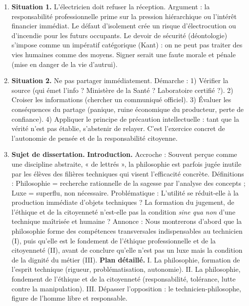 \documentclass[11pt]{article}
\begin{document}
\begin{corrige}
\begin{enumerate}
\item \textbf{Situation 1.} L'électricien doit refuser la réception. Argument : la responsabilité professionnelle prime sur la pression hiérarchique ou l'intérêt financier immédiat. Le défaut d'isolement crée un risque d'électrocution ou d'incendie pour les futurs occupants. Le devoir de sécurité (déontologie) s'impose comme un impératif catégorique (Kant) : on ne peut pas traiter des vies humaines comme des moyens. Signer serait une faute morale et pénale (mise en danger de la vie d'autrui).
\item \textbf{Situation 2.} Ne pas partager immédiatement. Démarche : 1) Vérifier la source (qui émet l'info ? Ministère de la Santé ? Laboratoire certifié ?). 2) Croiser les informations (chercher un communiqué officiel). 3) Évaluer les conséquences du partage (panique, ruine économique du producteur, perte de confiance). 4) Appliquer le principe de précaution intellectuelle : tant que la vérité n'est pas établie, s'abstenir de relayer. C'est l'exercice concret de l'autonomie de pensée et de la responsabilité citoyenne.
\item \textbf{Sujet de dissertation.}
\textbf{Introduction.} Accroche : Souvent perçue comme une discipline abstraite, « de lettrés », la philosophie est parfois jugée inutile par les élèves des filières techniques qui visent l'efficacité concrète. Définitions : Philosophie = recherche rationnelle de la sagesse par l'analyse des concepts ; Luxe = superflu, non nécessaire. Problématique : L'utilité se réduit-elle à la production immédiate d'objets techniques ? La formation du jugement, de l'éthique et de la citoyenneté n'est-elle pas la condition \emph{sine qua non} d'une technique maîtrisée et humaine ? Annonce : Nous montrerons d'abord que la philosophie forme des compétences transversales indispensables au technicien (I), puis qu'elle est le fondement de l'éthique professionnelle et de la citoyenneté (II), avant de conclure qu'elle n'est pas un luxe mais la condition de la dignité du métier (III).
\textbf{Plan détaillé.}
I. La philosophie, formation de l'esprit technique (rigueur, problématisation, autonomie).
II. La philosophie, fondement de l'éthique et de la citoyenneté (responsabilité, tolérance, lutte contre la manipulation).
III. Dépasser l'opposition : le technicien-philosophe, figure de l'homme libre et responsable.
\end{enumerate}
\end{corrige}
\end{document}
